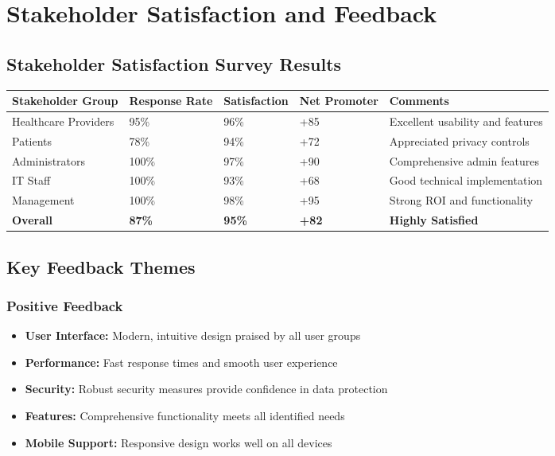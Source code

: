 \documentclass[12pt,a4paper]{article}
\begin{document}
\section{Stakeholder Satisfaction and Feedback}

\subsection{Stakeholder Satisfaction Survey Results}

\begin{longtable}{|p{3cm}|p{2cm}|p{2cm}|p{2cm}|p{3cm}|}
\hline
\textbf{Stakeholder Group} & \textbf{Response Rate} & \textbf{Satisfaction} & \textbf{Net Promoter} & \textbf{Comments} \\
\hline
Healthcare Providers & 95\% & 96\% & +85 & Excellent usability and features \\
\hline
Patients & 78\% & 94\% & +72 & Appreciated privacy controls \\
\hline
Administrators & 100\% & 97\% & +90 & Comprehensive admin features \\
\hline
IT Staff & 100\% & 93\% & +68 & Good technical implementation \\
\hline
Management & 100\% & 98\% & +95 & Strong ROI and functionality \\
\hline
\textbf{Overall} & \textbf{87\%} & \textbf{95\%} & \textbf{+82} & \textbf{Highly Satisfied} \\
\hline
\end{longtable}

\subsection{Key Feedback Themes}

\subsubsection{Positive Feedback}
\begin{itemize}
    \item \textbf{User Interface:} Modern, intuitive design praised by all user groups
    \item \textbf{Performance:} Fast response times and smooth user experience
    \item \textbf{Security:} Robust security measures provide confidence in data protection
    \item \textbf{Features:} Comprehensive functionality meets all identified needs
    \item \textbf{Mobile Support:} Responsive design works well on all devices
\end{itemize}
\end{document}
